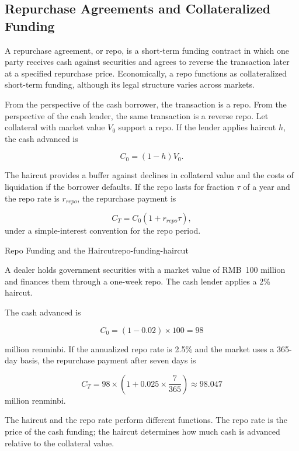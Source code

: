 \subsection{Repurchase Agreements and Collateralized Funding}

A repurchase agreement, or repo, is a short-term funding contract in which one party receives cash against securities and agrees to reverse the transaction later at a specified repurchase price. Economically, a repo functions as collateralized short-term funding, although its legal structure varies across markets.

From the perspective of the cash borrower, the transaction is a repo. From the perspective of the cash lender, the same transaction is a reverse repo. Let collateral with market value $V_0$ support a repo. If the lender applies haircut $h$, the cash advanced is

\begin{equation}
C_0=(1-h)V_0.
\label{eq:ch7-repo-cash-haircut}
\end{equation}

The haircut provides a buffer against declines in collateral value and the costs of liquidation if the borrower defaults. If the repo lasts for fraction $\tau$ of a year and the repo rate is $r_{repo}$, the repurchase payment is

\begin{equation}
C_T=C_0(1+r_{repo}\tau),
\label{eq:ch7-repo-repurchase-payment}
\end{equation}
under a simple-interest convention for the repo period.

\begin{example}{Repo Funding and the Haircut}{repo-funding-haircut}

A dealer holds government securities with a market value of RMB~100 million and finances them through a one-week repo. The cash lender applies a 2\% haircut.

The cash advanced is

\[
C_0=(1-0.02)\times100=98
\]

million renminbi. If the annualized repo rate is 2.5\%  and the market uses a 365-day basis, the repurchase payment after seven days is

\[
C_T=98\times\left(1+0.025\times\frac{7}{365}\right)
\approx 98.047
\]
million renminbi.

The haircut and the repo rate perform different functions. The repo rate is the price of the cash funding; the haircut determines how much cash is advanced relative to the collateral value.

\end{example}

